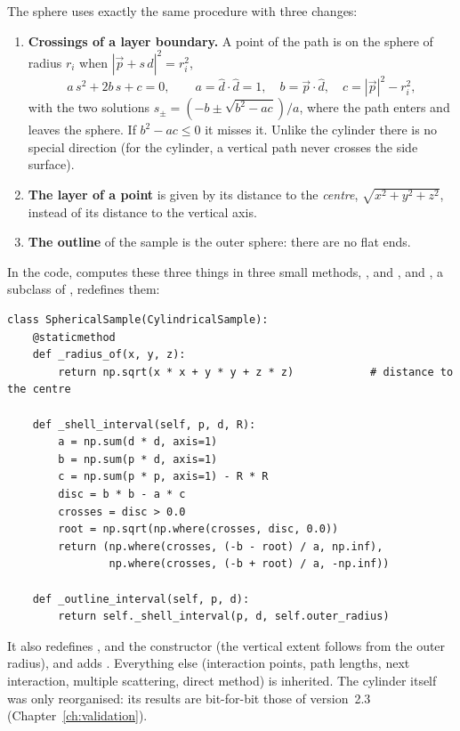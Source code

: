 The sphere uses exactly the same procedure with three changes:
\begin{enumerate}
  \item \textbf{Crossings of a layer boundary.} A point of the path is on the sphere of radius $r_i$ when $|\vec p + s\,\hat d|^2 = r_i^2$,
        \begin{equation}
          a\,s^2 + 2b\,s + c = 0, \qquad a = \hat d\cdot\hat d = 1,\quad b = \vec p\cdot\hat d,\quad c = |\vec p|^2 - r_i^2,
        \end{equation}
        with the two solutions $s_\pm = (-b \pm \sqrt{b^2 - ac})/a$, where the path enters and leaves the sphere. If $b^2-ac\le0$ it misses
        it. Unlike the cylinder there is no special direction (for the cylinder, a vertical path never crosses the side surface).
  \item \textbf{The layer of a point} is given by its distance to the \emph{centre}, $\sqrt{x^2+y^2+z^2}$, instead of its distance to
        the vertical axis.
  \item \textbf{The outline} of the sample is the outer sphere: there are no flat ends.
\end{enumerate}
In the code,  computes these three things in three small methods, ,  and
, and , a subclass of , redefines them:
\begin{lstlisting}
class SphericalSample(CylindricalSample):
    @staticmethod
    def _radius_of(x, y, z):
        return np.sqrt(x * x + y * y + z * z)            # distance to the centre

    def _shell_interval(self, p, d, R):
        a = np.sum(d * d, axis=1)
        b = np.sum(p * d, axis=1)
        c = np.sum(p * p, axis=1) - R * R
        disc = b * b - a * c
        crosses = disc > 0.0
        root = np.sqrt(np.where(crosses, disc, 0.0))
        return (np.where(crosses, (-b - root) / a, np.inf),
                np.where(crosses, (-b + root) / a, -np.inf))

    def _outline_interval(self, p, d):
        return self._shell_interval(p, d, self.outer_radius)
\end{lstlisting}
It also redefines ,  and the constructor (the vertical extent follows from the outer radius), and adds
. Everything else (interaction points, path lengths, next interaction, multiple scattering, direct method) is
inherited. The cylinder itself was only reorganised: its results are bit-for-bit those of version~2.3 (Chapter~\ref{ch:validation}).

